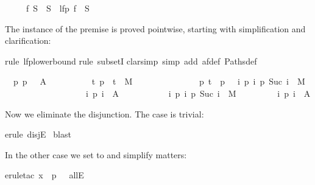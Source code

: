 \begin{isabellebody}
\begin{isamarkuptxt}
\begin{isabelle}
\ \ \ \ \ f\ S\ {\isasymsubseteq}\ S\ {\isasymLongrightarrow}\ lfp\ f\ {\isasymsubseteq}\ S%
\end{isabelle}
The instance of the premise  is proved pointwise,
starting with simplification and clarification:%
\end{isamarkuptxt}%
rule\ lfp{\isacharunderscore}lowerbound{\isacharparenright}\isanewline
{}rule\ subsetI{\isacharparenright}\isanewline
{}clarsimp\ simp\ add{\isacharcolon}\ af{\isacharunderscore}def\ Paths{\isacharunderscore}def{\isacharparenright}%
\begin{isamarkuptxt}%
\begin{isabelle}
\ {}{\isachardot}\ {\isasymAnd}p{\isachardot}\ {\isasymlbrakk}p\ {}\ {\isasymin}\ A\ {\isasymor}\isanewline
\ \ \ \ \ \ \ \ \ {\isacharparenleft}{\isasymforall}t{\isachardot}\ {\isacharparenleft}p\ {}{\isacharcomma}\ t{\isacharparenright}\ {\isasymin}\ M\ {\isasymlongrightarrow}\isanewline
\ \ \ \ \ \ \ \ \ \ \ \ \ \ {\isacharparenleft}{\isasymforall}p{\isachardot}\ t\ {\isacharequal}\ p\ {}\ {\isasymand}\ {\isacharparenleft}{\isasymforall}i{\isachardot}\ {\isacharparenleft}p\ i{\isacharcomma}\ p\ {\isacharparenleft}Suc\ i{\isacharparenright}{\isacharparenright}\ {\isasymin}\ M{\isacharparenright}\ {\isasymlongrightarrow}\isanewline
\ \ \ \ \ \ \ \ \ \ \ \ \ \ \ \ \ \ \ {\isacharparenleft}{\isasymexists}i{\isachardot}\ p\ i\ {\isasymin}\ A{\isacharparenright}{\isacharparenright}{\isacharparenright}{\isacharsemicolon}\isanewline
\ \ \ \ \ \ \ \ \ \ \ {\isasymforall}i{\isachardot}\ {\isacharparenleft}p\ i{\isacharcomma}\ p\ {\isacharparenleft}Suc\ i{\isacharparenright}{\isacharparenright}\ {\isasymin}\ M{\isasymrbrakk}\isanewline
\ \ \ \ \ \ \ \ {\isasymLongrightarrow}\ {\isasymexists}i{\isachardot}\ p\ i\ {\isasymin}\ A
\end{isabelle}
Now we eliminate the disjunction. The case  is trivial:%
\end{isamarkuptxt}%
erule\ disjE{\isacharparenright}\isanewline
\ blast{\isacharparenright}%
\begin{isamarkuptxt}%
\noindent
In the other case we set  to  and simplify matters:%
\end{isamarkuptxt}%
erule{\isacharunderscore}tac\ x\ {\isacharequal}\ {\isachardoublequote}p\ {}{\isachardoublequote}\ \ allE{\isacharparenright}\isanewline

\end{isabellebody}
